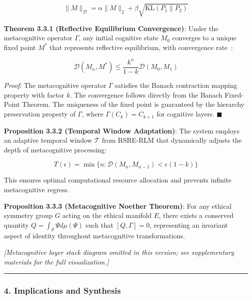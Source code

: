 \documentclass[12pt]{article}
\begin{document}
\[\|M\|_{\mathcal{D}} = \alpha\|M\|_2 + \beta\sqrt{\text{KL}(P_1 \| P_2)}\]

\textbf{Theorem 3.3.1 (Reflective Equilibrium Convergence)}: Under the
metacognitive operator \(\Gamma\), any initial cognitive state \(M_0\)
converges to a unique fixed point \(M^*\) that represents reflective
equilibrium, with convergence rate~\cite{ursmif}:

\[\mathcal{D}(M_n, M^*) \leq \frac{k^n}{1-k}\mathcal{D}(M_0, M_1)\]

\emph{Proof}: The metacognitive operator \(\Gamma\) satisfies the Banach
contraction mapping property with factor \(k\). The convergence follows
directly from the Banach Fixed-Point Theorem. The uniqueness of the
fixed point is guaranteed by the hierarchy preservation property of
\(\Gamma\), where \(\Gamma(C_k) = C_{k+1}\) for cognitive layers. $\blacksquare$

\textbf{Proposition 3.3.2 (Temporal Window Adaptation)}: The system
employs an adaptive temporal window \(\mathcal{T}\) from RSRE-RLM that
dynamically adjusts the depth of metacognitive processing:

\[T(\epsilon) = \min\{n : \mathcal{D}(M_n, M_{n-1}) < \epsilon(1-k)\}\]

This ensures optimal computational resource allocation and prevents
infinite metacognitive regress.

\textbf{Proposition 3.3.3 (Metacognitive Noether Theorem)}: For any
ethical symmetry group \(G\) acting on the ethical manifold \(E\), there
exists a conserved quantity \(Q = \int_{\mathcal{S}} \Psi d\mu(\Psi)\)
such that \([Q, \Gamma] = 0\), representing an invariant aspect of
identity throughout metacognitive transformations.


\begin{center}
\textit{[Metacognitive layer stack diagram omitted in this version; see supplementary materials for the full visualization.]}
\end{center}

\begin{center}\rule{0.5\linewidth}{0.5pt}\end{center}

\subsubsection{\texorpdfstring{\textbf{4. Implications and
Synthesis}}{4. Implications and Synthesis}}\label{implications-and-synthesis}
\end{document}

